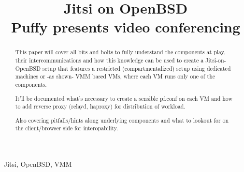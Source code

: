 \documentclass[conference]{IEEEtran}
\begin{document}
\title{Jitsi on OpenBSD\\
{\Large Puffy presents video conferencing}
}

\author{

}

\maketitle

\begin{abstract}
This paper will cover all bits and bolts to fully understand the components
at play, their intercommunications and how this knowledge can be used to create
a Jitsi-on-OpenBSD setup that features a restricted (compartmentalized) setup using
dedicated machines or -as shown- VMM based VMs, where each VM runs only one of the
components.

It'll be documented what's necessary to create a sensible pf.conf on each VM and how to
add reverse proxy (relayd, haproxy) for distribution of workload.

Also covering pitfalls/hints along underlying components and what to lookout for on 
the client/browser side for interopability.
\end{abstract}

\begin{IEEEkeywords}
Jitsi, OpenBSD, VMM
\end{IEEEkeywords}

\end{document}
